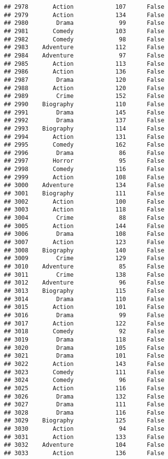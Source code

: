 \documentclass[
]{article}
\begin{document}
\begin{verbatim}
## 2978       Action            107      False
## 2979       Action            134      False
## 2980        Drama             99      False
## 2981       Comedy            103      False
## 2982       Comedy             98      False
## 2983    Adventure            112      False
## 2984    Adventure             97      False
## 2985       Action            113      False
## 2986       Action            136      False
## 2987        Drama            120      False
## 2988       Action            120      False
## 2989        Crime            152      False
## 2990    Biography            110      False
## 2991        Drama            145      False
## 2992        Drama            137      False
## 2993    Biography            114      False
## 2994       Action            131      False
## 2995       Comedy            162      False
## 2996        Drama             86      False
## 2997       Horror             95      False
## 2998       Comedy            116      False
## 2999       Action            108      False
## 3000    Adventure            134      False
## 3001    Biography            111      False
## 3002       Action            100      False
## 3003       Action            118      False
## 3004        Crime             88      False
## 3005       Action            144      False
## 3006        Drama            108      False
## 3007       Action            123      False
## 3008    Biography            140      False
## 3009        Crime            129      False
## 3010    Adventure             85      False
## 3011        Crime            138      False
## 3012    Adventure             96      False
## 3013    Biography            115      False
## 3014        Drama            110      False
## 3015       Action            101      False
## 3016        Drama             99      False
## 3017       Action            122      False
## 3018       Comedy             92      False
## 3019        Drama            118      False
## 3020        Drama            105      False
## 3021        Drama            101      False
## 3022       Action            143      False
## 3023       Comedy            111      False
## 3024       Comedy             96      False
## 3025       Action            116      False
## 3026        Drama            132      False
## 3027        Drama            111      False
## 3028        Drama            116      False
## 3029    Biography            125      False
## 3030       Action             94      False
## 3031       Action            133      False
## 3032    Adventure            104      False
## 3033       Action            136      False

\end{verbatim}
\end{document}
